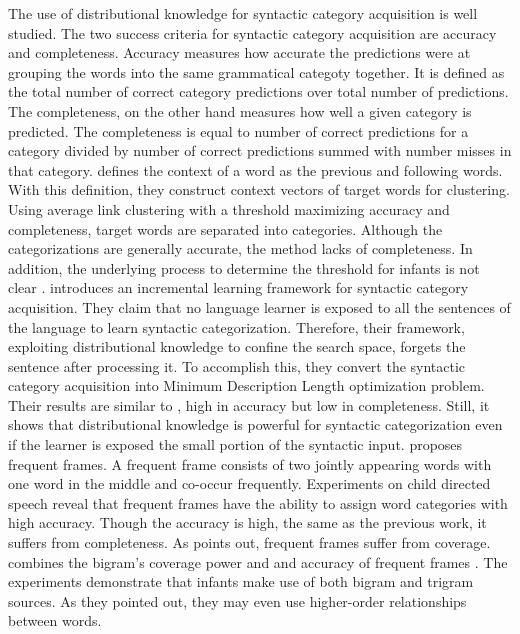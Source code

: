 The use of distributional knowledge for syntactic category acquisition
is well studied. The two success criteria for syntactic category
acquisition are accuracy and completeness. Accuracy measures how
accurate the predictions were at grouping the words into the
same grammatical categoty together. It is defined
as the total number of correct category predictions
over total number of predictions. The completeness, on the other hand
measures how well a given category is predicted. The completeness
is equal to number of correct predictions for a category divided
by number of correct predictions summed with number misses in that category.
\cite{Redington98distributionalinformation} defines the context of
a word as the previous and following words. With this definition, they construct
context vectors of target words for clustering. Using average link clustering
with a threshold maximizing accuracy and completeness, target  words are
separated into categories. Although the categorizations are generally accurate,
the method lacks of completeness. In addition, the underlying process to determine
the threshold for infants is not clear \cite{ambridge2011child}. \cite{cartwright1997syntactic} introduces an incremental learning framework for syntactic category acquisition. They claim that no language 
learner is exposed to all the sentences of the language to learn
syntactic categorization. Therefore, their framework, exploiting
distributional knowledge to confine the search space, forgets the sentence
after processing it. To accomplish this, they convert the syntactic category acquisition into 
Minimum Description Length optimization problem. Their results are 
similar to \cite{Redington98distributionalinformation}, high in 
accuracy but low in completeness. Still, it shows that distributional
knowledge is powerful for syntactic categorization even if the learner is
exposed the small portion of the syntactic input. \cite{Mintz200391} proposes frequent frames. A frequent frame consists of two jointly appearing words with one word in the middle and co-occur
frequently. Experiments on child directed speech reveal that 
frequent frames have the ability to assign word categories with high
accuracy. Though the accuracy is high, the same as the previous work, it suffers from
completeness. As \cite{clair2010} points out, frequent frames suffer from coverage.
\cite{clair2010} combines the bigram's 
coverage power \cite{Redington98distributionalinformation} and \cite{monaghan2008integration}
 and accuracy of frequent frames \cite{Mintz200391}. The 
experiments demonstrate that infants make use of both bigram and 
trigram sources. As they pointed out, they may even use higher-order 
relationships between words. 

